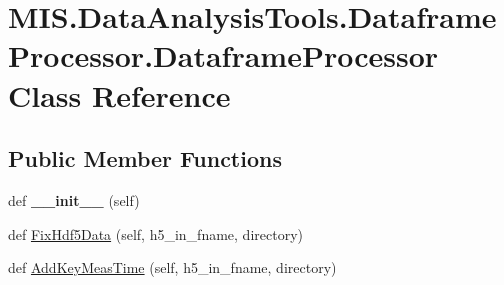 \hypertarget{classMIS_1_1DataAnalysisTools_1_1DataframeProcessor_1_1DataframeProcessor}{}\section{M\+I\+S.\+Data\+Analysis\+Tools.\+Dataframe\+Processor.\+Dataframe\+Processor Class Reference}
\label{classMIS_1_1DataAnalysisTools_1_1DataframeProcessor_1_1DataframeProcessor}
\subsection*{Public Member Functions}
\begin{DoxyCompactItemize}
\item 
\mbox{\label{classMIS_1_1DataAnalysisTools_1_1DataframeProcessor_1_1DataframeProcessor_a0ca3298ac4090f0c4d903fe4c08794e0}} 
def {\bfseries \+\_\+\+\_\+init\+\_\+\+\_\+} (self)
\item 
def \hyperlink{classMIS_1_1DataAnalysisTools_1_1DataframeProcessor_1_1DataframeProcessor_a770a91fb29ef3031ceb7f28dbfe7115b}{Fix\+Hdf5\+Data} (self, h5\+\_\+in\+\_\+fname, directory)
\item 
def \hyperlink{classMIS_1_1DataAnalysisTools_1_1DataframeProcessor_1_1DataframeProcessor_a0ed34869bdbc6a323e07eb14242715e5}{Add\+Key\+Meas\+Time} (self, h5\+\_\+in\+\_\+fname, directory)
\end{DoxyCompactItemize}
